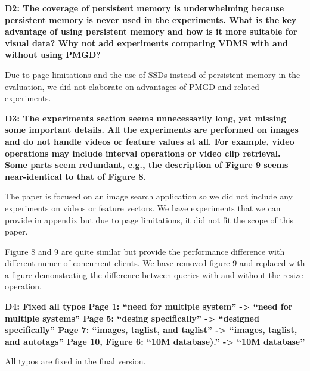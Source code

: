 \documentclass[11pt]{proposalnsf}
\begin{document}
\bigskip
\textbf{
D2: The coverage of persistent memory is underwhelming because persistent memory
is never used in the experiments.
What is the key advantage of using persistent memory and how is it
more suitable for visual data? Why not add experiments comparing VDMS with
and without using PMGD?
}\bigskip

Due to page limitations and the use of SSDs instead of persistent memory in the
evaluation, we did not elaborate on advantages of PMGD and related experiments.

\bigskip
\textbf{
D3: The experiments section seems unnecessarily long, yet missing some important
details. All the experiments are performed on images and do not handle videos or feature
values at all. For example, video operations may include interval operations or video
clip retrieval. Some parts seem redundant, e.g., the description of Figure 9 seems
near-identical to that of Figure 8.
}\bigskip

The paper is focused on an image search application so we did not include any
experiments on videos or feature vectors. We have experiments that we can provide in
appendix but due to page limitations, it did not fit the scope of this paper.

Figure 8 and 9 are quite similar but provide the performance difference with different
numer of concurrent clients. We have removed figure 9 and replaced with a figure
demonstrating the difference between queries with and without the resize operation.

\bigskip
\textbf{
D4: Fixed all typos
Page 1: “need for multiple system” -> “need for multiple systems”
Page 5: “desing specifically” -> “designed specifically”
Page 7: “images, taglist, and taglist” -> “images, taglist, and autotags”
Page 10, Figure 6: “10M database).” -> “10M database”
}\bigskip

All typos are fixed in the final version.

\end{document}
